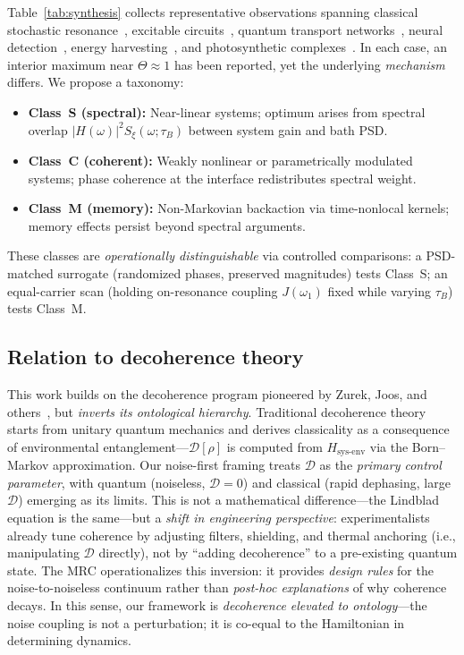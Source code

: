 \documentclass[11pt,letterpaper]{article}
\begin{document}
Table~\ref{tab:synthesis} collects representative observations spanning 
classical stochastic resonance~\cite{Mondal2018}, excitable 
circuits~\cite{Brugioni2005}, quantum transport 
networks~\cite{Moreira2020}, neural detection~\cite{Duan2014}, energy 
harvesting~\cite{RomeroBastida2020}, and photosynthetic 
complexes~\cite{Uchiyama2017}. In each case, an interior maximum near 
$\Theta\approx 1$ has been reported, yet the underlying \emph{mechanism} 
differs. We propose a taxonomy:
\begin{itemize}[leftmargin=*,noitemsep,topsep=0pt]
\item \textbf{Class~S (spectral):} Near-linear systems; optimum arises 
from spectral overlap $|H(\omega)|^2 S_\xi(\omega;\tau_B)$ between 
system gain and bath PSD.
\item \textbf{Class~C (coherent):} Weakly nonlinear or parametrically 
modulated systems; phase coherence at the interface redistributes 
spectral weight.
\item \textbf{Class~M (memory):} Non-Markovian backaction via 
time-nonlocal kernels; memory effects persist beyond spectral arguments.
\end{itemize}
These classes are \emph{operationally distinguishable} via controlled 
comparisons: a PSD-matched surrogate (randomized phases, preserved 
magnitudes) tests Class~S; an equal-carrier scan (holding on-resonance 
coupling $J(\omega_1)$ fixed while varying $\tau_B$) tests Class~M.

\subsection{Relation to decoherence theory}

This work builds on the decoherence program pioneered by Zurek, Joos, 
and others~\cite{zurek2003_decoherence,joos2003}, but \emph{inverts its 
ontological hierarchy}. Traditional decoherence theory starts from 
unitary quantum mechanics and derives classicality as a consequence of 
environmental entanglement—$\mathcal{D}[\rho]$ is computed from 
$H_{\text{sys-env}}$ via the Born--Markov approximation. Our noise-first 
framing treats $\mathcal{D}$ as the \emph{primary control parameter}, 
with quantum (noiseless, $\mathcal{D}=0$) and classical (rapid 
dephasing, large $\mathcal{D}$) emerging as its limits. This is not a 
mathematical difference---the Lindblad equation is the same---but a 
\emph{shift in engineering perspective}: experimentalists already tune 
coherence by adjusting filters, shielding, and thermal anchoring (i.e., 
manipulating $\mathcal{D}$ directly), not by ``adding decoherence'' to a 
pre-existing quantum state. The MRC operationalizes this inversion: it 
provides \emph{design rules} for the noise-to-noiseless continuum rather 
than \emph{post-hoc explanations} of why coherence decays. In this 
sense, our framework is \emph{decoherence elevated to ontology}---the 
noise coupling is not a perturbation; it is co-equal to the Hamiltonian 
in determining dynamics.
\end{document}
